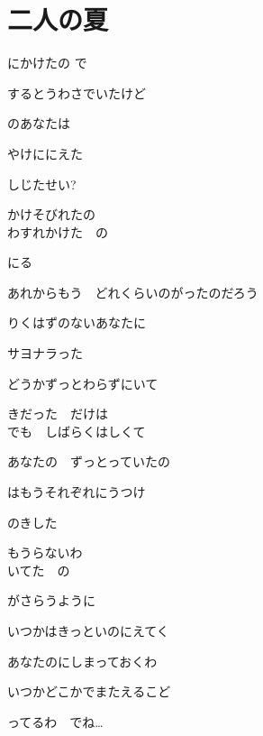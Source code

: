 \section{ 二人の夏}
\large{

にかけたの で

するとうわさでいたけど

のあなたは

やけににえた

しじたせい?

かけそびれたの
\\

わすれかけた　の

にる

あれからもう　どれくらいのがったのだろう

りくはずのないあなたに

サヨナラった

どうかずっとわらずにいて

きだった　だけは
\\

でも　しばらくはしくて

あなたの　ずっとっていたの

はもうそれぞれにうつけ

のきした

もうらないわ
\\

いてた　の

がさらうように

いつかはきっといのにえてく

あなたのにしまっておくわ

いつかどこかでまたえるこど

ってるわ　でね…

}